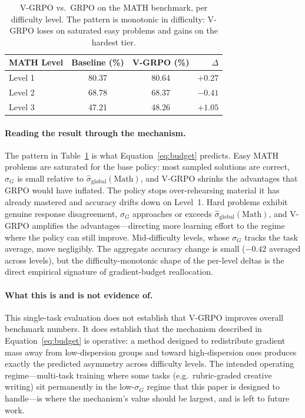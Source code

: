 \documentclass[10pt]{article}
\begin{document}
\begin{table}[h]
\centering
\small
\begin{tabular}{lccr}
\toprule
\textbf{MATH Level} & \textbf{Baseline (\%)} & \textbf{V-GRPO (\%)} & $\Delta$ \\
\midrule
Level 1             & 80.37 & 80.64 & $+0.27$ \\
Level 2             & 68.78 & 68.37 & $-0.41$ \\
Level 3    & 47.21 & 48.26 & $+1.05$ \\
\bottomrule
\end{tabular}
\caption{V-GRPO vs.\ GRPO on the MATH benchmark, per difficulty level. The
pattern is monotonic in difficulty: V-GRPO loses on saturated easy problems
and gains on the hardest tier.}
\label{tab:math}
\end{table}

\paragraph{Reading the result through the mechanism.}
The pattern in Table~\ref{tab:math} is what
Equation~\eqref{eq:budget} predicts. Easy MATH problems are saturated for the
base policy: most sampled solutions are correct, $\sigma_G$ is small relative to
$\hat{\sigma}_{\text{global}}(\text{Math})$, and V-GRPO shrinks the advantages
that GRPO would have inflated. The policy stops over-rehearsing material it has
already mastered and accuracy drifts down on Level~1. Hard problems exhibit
genuine response disagreement, $\sigma_G$ approaches or exceeds
$\hat{\sigma}_{\text{global}}(\text{Math})$, and V-GRPO amplifies the
advantages---directing more learning effort to the regime where the policy can
still improve. Mid-difficulty levels, whose $\sigma_G$ tracks the task average,
move negligibly. The aggregate accuracy change is small ($-0.42$ averaged across
levels), but the difficulty-monotonic shape of the per-level deltas is the
direct empirical signature of gradient-budget reallocation.

\paragraph{What this is and is not evidence of.}
This single-task evaluation does not establish that V-GRPO improves overall
benchmark numbers. It does establish that the mechanism described in
Equation~\eqref{eq:budget} is operative: a method designed to redistribute
gradient mass away from low-dispersion groups and toward high-dispersion ones
produces exactly the predicted asymmetry across difficulty levels. The intended
operating regime---multi-task training where some tasks (e.g.\ rubric-graded
creative writing) sit permanently in the low-$\sigma_G$ regime that this paper
is designed to handle---is where the mechanism's value should be largest, and is
left to future work.
\end{document}
